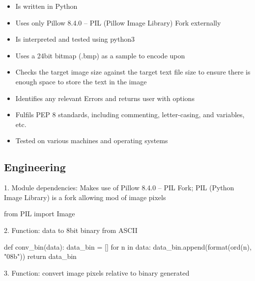 \documentclass[11pt, english]{article}
\begin{document}
	\begin{itemize}
        \setlength\itemsep{0cm}
		\item Is written in Python
		\item Uses only Pillow 8.4.0 -- PIL (Pillow Image Library) Fork externally
		\item Is interpreted and tested using python3
		\item Uses a 24bit bitmap (.bmp) as a sample to encode upon
		\item Checks the target image size against the target text file size to ensure there is enough space to store the text in the image
		\item Identifies any relevant Errors and returns user with options
		\item Fulfils PEP 8 standards, including commenting, letter-casing, and variables, etc.
		\item Tested on various machines and operating systems
	\end{itemize}

\newpage

	\subsection{Engineering}

	1. Module dependencies: Makes use of Pillow 8.4.0 -- PIL Fork; PIL (Python Image Library) is a fork allowing mod of image pixels

	{\small\begin{python}
	from PIL import Image
	\end{python}}

	2. Function: data to 8bit binary from ASCII

	{\small\begin{python}
	def conv_bin(data):
    	    data_bin = []
    	    for n in data:
                data_bin.append(format(ord(n), "08b"))
    	    return data_bin
	\end{python}}
	
	3. Function: convert image pixels relative to binary generated
\end{document}
